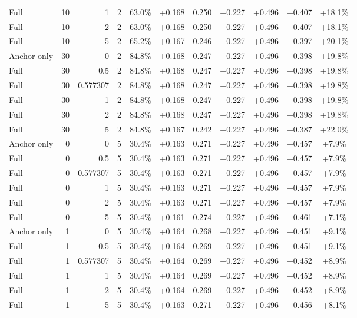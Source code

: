 \begin{table}[htbp]
\begin{tabular}{lrrrccccccc}
Full & 10 & 1 & 2 & 63.0\% & +0.168 & 0.250 & +0.227 & +0.496 & +0.407 & +18.1\% \\
Full & 10 & 2 & 2 & 63.0\% & +0.168 & 0.250 & +0.227 & +0.496 & +0.407 & +18.1\% \\
Full & 10 & 5 & 2 & 65.2\% & +0.167 & 0.246 & +0.227 & +0.496 & +0.397 & +20.1\% \\
Anchor only & 30 & 0 & 2 & 84.8\% & +0.168 & 0.247 & +0.227 & +0.496 & +0.398 & +19.8\% \\
Full & 30 & 0.5 & 2 & 84.8\% & +0.168 & 0.247 & +0.227 & +0.496 & +0.398 & +19.8\% \\
Full & 30 & 0.577307 & 2 & 84.8\% & +0.168 & 0.247 & +0.227 & +0.496 & +0.398 & +19.8\% \\
Full & 30 & 1 & 2 & 84.8\% & +0.168 & 0.247 & +0.227 & +0.496 & +0.398 & +19.8\% \\
Full & 30 & 2 & 2 & 84.8\% & +0.168 & 0.247 & +0.227 & +0.496 & +0.398 & +19.8\% \\
Full & 30 & 5 & 2 & 84.8\% & +0.167 & 0.242 & +0.227 & +0.496 & +0.387 & +22.0\% \\
Anchor only & 0 & 0 & 5 & 30.4\% & +0.163 & 0.271 & +0.227 & +0.496 & +0.457 & +7.9\% \\
Full & 0 & 0.5 & 5 & 30.4\% & +0.163 & 0.271 & +0.227 & +0.496 & +0.457 & +7.9\% \\
Full & 0 & 0.577307 & 5 & 30.4\% & +0.163 & 0.271 & +0.227 & +0.496 & +0.457 & +7.9\% \\
Full & 0 & 1 & 5 & 30.4\% & +0.163 & 0.271 & +0.227 & +0.496 & +0.457 & +7.9\% \\
Full & 0 & 2 & 5 & 30.4\% & +0.163 & 0.271 & +0.227 & +0.496 & +0.457 & +7.9\% \\
Full & 0 & 5 & 5 & 30.4\% & +0.161 & 0.274 & +0.227 & +0.496 & +0.461 & +7.1\% \\
Anchor only & 1 & 0 & 5 & 30.4\% & +0.164 & 0.268 & +0.227 & +0.496 & +0.451 & +9.1\% \\
Full & 1 & 0.5 & 5 & 30.4\% & +0.164 & 0.269 & +0.227 & +0.496 & +0.451 & +9.1\% \\
Full & 1 & 0.577307 & 5 & 30.4\% & +0.164 & 0.269 & +0.227 & +0.496 & +0.452 & +8.9\% \\
Full & 1 & 1 & 5 & 30.4\% & +0.164 & 0.269 & +0.227 & +0.496 & +0.452 & +8.9\% \\
Full & 1 & 2 & 5 & 30.4\% & +0.164 & 0.269 & +0.227 & +0.496 & +0.452 & +8.9\% \\
Full & 1 & 5 & 5 & 30.4\% & +0.163 & 0.271 & +0.227 & +0.496 & +0.456 & +8.1\% \\

\end{tabular}
\end{table}
